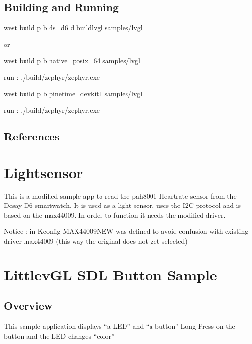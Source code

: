 \documentclass[letterpaper,10pt,english]{sphinxmanual}
\begin{document}
\subsection{Building and Running}
\label{\detokenize{samples/sampleslvglREADME:building-and-running}}
west build \sphinxhyphen{}p \sphinxhyphen{}b ds\_d6 \sphinxhyphen{}d build\sphinxhyphen{}lvgl samples/lvgl

or

west build \sphinxhyphen{}p \sphinxhyphen{}b native\_posix\_64 samples/lvgl

run : ./build/zephyr/zephyr.exe

west build \sphinxhyphen{}p \sphinxhyphen{}b pinetime\_devkit1 samples/lvgl

run : ./build/zephyr/zephyr.exe


\subsection{References}
\label{\detokenize{samples/sampleslvglREADME:references}}

\section{Lightsensor}
\label{\detokenize{samples/samplesmax44009README:lightsensor}}\label{\detokenize{samples/samplesmax44009README::doc}}
This is a modified sample app to read the pah8001 Heartrate sensor from the Desay D6 smartwatch.
It is used as a light sensor, uses the I2C protocol and is based on the max44009.
In order to function it needs the modified driver.

Notice :  in Kconfig MAX44009NEW was defined to avoid confusion with existing driver max44009
(this way the original does not get selected)


\section{LittlevGL SDL Button  Sample}
\label{\detokenize{samples/samplespinebuttonREADME:littlevgl-sdl-button-sample}}\label{\detokenize{samples/samplespinebuttonREADME:sdl-sample}}\label{\detokenize{samples/samplespinebuttonREADME::doc}}

\subsection{Overview}
\label{\detokenize{samples/samplespinebuttonREADME:overview}}
This sample application displays “a LED” and “a button”
Long Press on the button and the LED changes “color”
\end{document}
